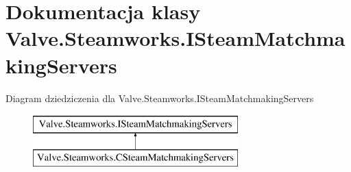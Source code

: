 \hypertarget{class_valve_1_1_steamworks_1_1_i_steam_matchmaking_servers}{}\section{Dokumentacja klasy Valve.\+Steamworks.\+I\+Steam\+Matchmaking\+Servers}
\label{class_valve_1_1_steamworks_1_1_i_steam_matchmaking_servers}
Diagram dziedziczenia dla Valve.\+Steamworks.\+I\+Steam\+Matchmaking\+Servers\begin{figure}[H]
\begin{center}
\leavevmode
\includegraphics[height=2.000000cm]{class_valve_1_1_steamworks_1_1_i_steam_matchmaking_servers}
\end{center}
\end{figure}
